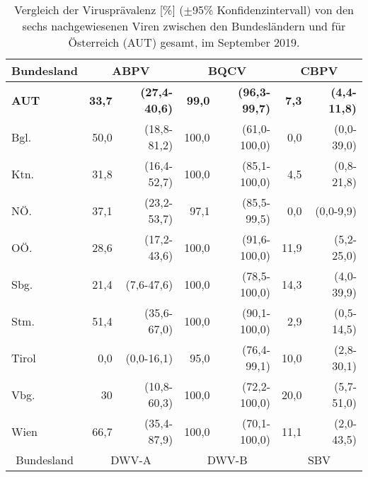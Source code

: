 \begin{table}[H]
    \caption{Vergleich der Virusprävalenz [\%] (\(\pm \)95\% Konfidenzintervall) von den sechs nachgewiesenen Viren zwischen den Bundesländern und für Österreich (AUT) gesamt, im September 2019.}
    \centering
    \footnotesize
    \label{tab:j:praevalenz_BL}
    \begin{tabular}{l|*{2}{rr|}rr}
        \toprule    
        \multicolumn{1}{c|}{Bundesland} & 
        \multicolumn{2}{c|}{ABPV}   & 
        \multicolumn{2}{c|}{BQCV}   & 
        \multicolumn{2}{c}{CBPV}   \\
        \midrule
        
	    \textbf{AUT} & \textbf{33,7} & \textbf{(27,4-40,6)} & \textbf{99,0} & \textbf{(96,3-99,7)} &  \textbf{7,3} &  \textbf{(4,4-11,8)} \\
        Bgl. & 50,0 & (18,8-81,2) & 100,0 & (61,0-100,0) &  0,0 & (0,0-39,0) \\
        Ktn. & 31,8 & (16,4-52,7) & 100,0 & (85,1-100,0) &  4,5 &  (0,8-21,8) \\
        NÖ. & 37,1 & (23,2-53,7) & 97,1 & (85,5-99,5) &  0,0 & (0,0-9,9)     \\
        OÖ. & 28,6 & (17,2-43,6) & 100,0 & (91,6-100,0) &  11,9 &  (5,2-25,0) \\
        Sbg. & 21,4 & (7,6-47,6) & 100,0 & (78,5-100,0) &  14,3 &  (4,0-39,9) \\
        Stm. & 51,4 & (35,6-67,0) & 100,0 & (90,1-100,0) &  2,9 &  (0,5-14,5) \\
        Tirol & 0,0 & (0,0-16,1) & 95,0 & (76,4-99,1) &  10,0 &  (2,8-30,1) \\
        Vbg. & 30 & (10,8-60,3) & 100,0 & (72,2-100,0) &  20,0 &  (5,7-51,0) \\
        Wien & 66,7 & (35,4-87,9) & 100,0 & (70,1-100,0) &  11,1 &  (2,0-43,5) \\

        \midrule    
        \multicolumn{1}{c|}{Bundesland} & 
        \multicolumn{2}{c|}{DWV-A}   & 
        \multicolumn{2}{c|}{DWV-B}   & 
        \multicolumn{2}{c}{SBV}   \\
        \midrule


\end{tabular}
\end{table}
